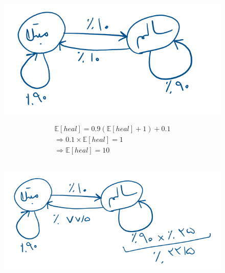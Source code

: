 \documentclass{university}
\begin{document}
\subsection{}
\begin{figure}[H]
    \centering
    \includegraphics[width=\textwidth]{assets/2a.png}
\end{figure}
\begin{gather*}
    \mathbb{E}[heal] = 0.9 (\mathbb{E}[heal] + 1) + 0.1 \\
    \Rightarrow 0.1 \times \mathbb{E}[heal] = 1 \\
    \Rightarrow \mathbb{E}[heal] = 10
\end{gather*}

\subsection{}
\begin{figure}[H]
    \centering
    \includegraphics[width=\textwidth]{assets/2b.png}
\end{figure}
\end{document}
